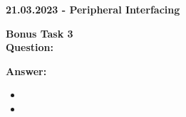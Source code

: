 \documentclass[12pt,a4paper]{letter}
\begin{document}
	\textbf{21.03.2023 - Peripheral Interfacing}

	\textbf{Bonus Task 3}\\

	\textbf{Question:}

	\textbf{Answer:}

	\begin{itemize}
		\item
		\item
	\end{itemize}
\end{document}
